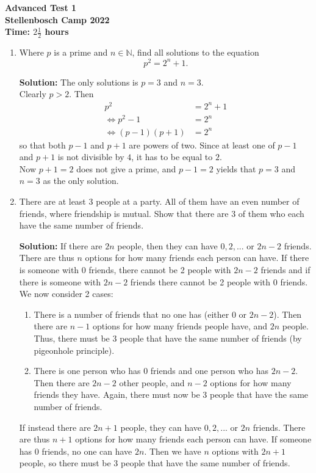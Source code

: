 \documentclass{article}
\begin{document}
\thispagestyle{empty}

\begin{center}
  \textbf{\Large Advanced Test 1}
  \\ \vspace{1em}
  \textbf{\large Stellenbosch Camp 2022}
  \\ \vspace{1em}
  \textbf{\large Time: $2\frac{1}{2}$ hours}
\end{center}

\bigskip

\begin{enumerate}[itemsep=\fill]
\item %
Where $p$ is a prime and $n\in\mathbb{N}$, find all solutions to the equation \[p^2 = 2^n + 1.\]

\textbf{Solution:} The only solutions is $p = 3$ and $n = 3$.
\\ Clearly $p>2$. Then 
\begin{align*}
	p^2 &= 2^n + 1
	\\ \iff p^2-1 &= 2^n
	\\ \iff (p-1)(p+1) &= 2^n
\end{align*}
so that both $p-1$ and $p+1$ are powers of two. Since at least one of $p-1$ and $p+1$ is not divisible by $4$, it has to be equal to $2$.
\\ Now $p+1 = 2$ does not give a prime, and $p-1 = 2$ yields that $p =3$ and $n=3$ as the only solution. 
\item %
There are at least 3 people at a party. All of them have an even number of friends, where friendship is mutual. Show that there are 3 of them who each have the same number of friends.

\textbf{Solution:} If there are $2n$ people, then they can have $0,2,...$ or $2n-2$ friends. There are thus $n$ options for how many friends each person can have. If there is someone with 0 friends, there cannot be 2 people with $2n-2$ friends and if there is someone with $2n-2$ friends there cannot be 2 people with 0 friends. We now consider 2 cases:
\begin{enumerate}
\item There is a number of friends that no one has (either 0 or $2n-2$). Then there are $n-1$ options for how many friends people have, and $2n$ people. Thus, there must be 3 people that have the same number of friends (by pigeonhole principle).
\item There is one person who has 0 friends and one person who has $2n-2$. Then there are $2n-2$ other people, and $n-2$ options for how many friends they have. Again, there must now be 3 people that have the same number of friends.
\end{enumerate}
If instead there are $2n+1$ people, they can have $0,2,...$ or $2n$ friends. There are thus $n+1$ options for how many friends each person can have. If someone has 0 friends, no one can have $2n$. Then we have $n$ options with $2n+1$ people, so there must be 3 people that have the same number of friends.



\end{enumerate}
\end{document}
